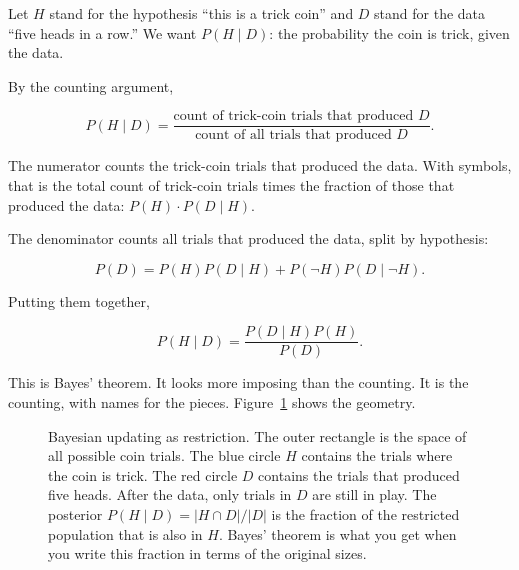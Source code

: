 Let $H$ stand for the hypothesis ``this is a trick coin'' and $D$ stand for the data ``five heads in a row.'' We want $P(H \mid D)$: the probability the coin is trick, given the data.

By the counting argument,

$$P(H \mid D) = \frac{\text{count of trick-coin trials that produced } D}{\text{count of all trials that produced } D}.$$

The numerator counts the trick-coin trials that produced the data. With symbols, that is the total count of trick-coin trials times the fraction of those that produced the data: $P(H) \cdot P(D \mid H)$.

The denominator counts all trials that produced the data, split by hypothesis:

$$P(D) = P(H) P(D \mid H) + P(\neg H) P(D \mid \neg H).$$

Putting them together,

$$P(H \mid D) = \frac{P(D \mid H) P(H)}{P(D)}.$$

This is Bayes' theorem. It looks more imposing than the counting. It is the counting, with names for the pieces. Figure~\ref{fig:bayes-restriction} shows the geometry.

\begin{figure}[h]
\centering
{}
\caption{Bayesian updating as restriction. The outer rectangle is the space of all possible coin trials. The blue circle $H$ contains the trials where the coin is trick. The red circle $D$ contains the trials that produced five heads. After the data, only trials in $D$ are still in play. The posterior $P(H \mid D) = |H \cap D| / |D|$ is the fraction of the restricted population that is also in $H$. Bayes' theorem is what you get when you write this fraction in terms of the original sizes.}
\label{fig:bayes-restriction}
\end{figure}

